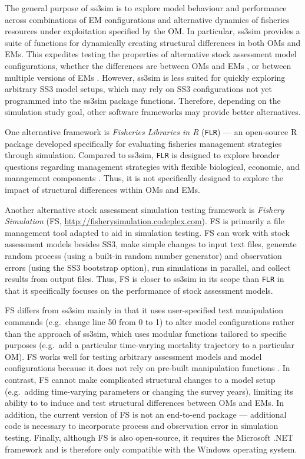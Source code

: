 \documentclass[10pt]{article}
\begin{document}
The general purpose of ss3sim is to explore model behaviour and performance across combinations of EM configurations and alternative dynamics of fisheries resources under exploitation specified by the OM. In particular, ss3sim provides a suite of functions for dynamically creating structural differences in both OMs and EMs. This expedites testing the properties of alternative stock assessment model configurations, whether the differences are between OMs and EMs \cite{johnson2013}, or between multiple versions of EMs \cite{ono2013}. However, ss3sim is less suited for quickly exploring arbitrary SS3 model setups, which may rely on SS3 configurations not yet programmed into the ss3sim package functions. Therefore, depending on the simulation study goal, other software frameworks may provide better alternatives.

One alternative framework is \emph{Fisheries Libraries in R} (\texttt{FLR}) \cite{kell2007} --- an open-source R package developed specifically for evaluating fisheries management strategies through simulation. Compared to ss3sim, \texttt{FLR} is designed to explore broader questions regarding management strategies with flexible biological, economic, and management components \cite{hillary2009}. Thus, it is not specifically designed to explore the impact of structural differences within OMs and EMs.

Another alternative stock assessment simulation testing framework is \emph{Fishery Simulation} (FS, \url{http://fisherysimulation.codeplex.com}). FS is primarily a file management tool adapted to aid in simulation testing. FS can work with stock assessment models besides SS3, make simple changes to input text files, generate random process (using a built-in random number generator) and observation errors (using the SS3 bootstrap option), run simulations in parallel, and collect results from output files. Thus, FS is closer to ss3sim in its scope than \texttt{FLR} in that it specifically focuses on the performance of stock assessment models.

FS differs from ss3sim mainly in that it uses user-specified text manipulation commands (e.g.~change line 50 from 0 to 1) to alter model configurations rather than the approach of ss3sim, which uses modular functions tailored to specific purposes (e.g.~add a particular time-varying mortality trajectory to a particular OM). FS works well for testing arbitrary assessment models and model configurations because it does not rely on pre-built manipulation functions \cite{lee2012, piner2011, lee2011}. In contrast, FS cannot make complicated structural changes to a model setup (e.g.~adding time-varying parameters or changing the survey years), limiting its ability to to induce and test structural differences between OMs and EMs. In addition, the current version of FS is not an end-to-end package --- additional code is necessary to incorporate process and observation error in simulation testing. Finally, although FS is also open-source, it requires the Microsoft .NET framework and is therefore only compatible with the Windows operating system.
\end{document}
